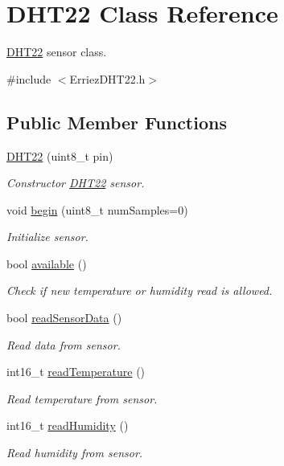 \hypertarget{class_d_h_t22}{}\section{D\+H\+T22 Class Reference}
\label{class_d_h_t22}


\hyperlink{class_d_h_t22}{D\+H\+T22} sensor class.  




{\ttfamily \#include $<$Erriez\+D\+H\+T22.\+h$>$}

\subsection*{Public Member Functions}
\begin{DoxyCompactItemize}
\item 
\hyperlink{class_d_h_t22_a6983635331e939d679888b4a936e0f53}{D\+H\+T22} (uint8\+\_\+t pin)
\begin{DoxyCompactList}\small\item\em Constructor \hyperlink{class_d_h_t22}{D\+H\+T22} sensor. \end{DoxyCompactList}\item 
void \hyperlink{class_d_h_t22_a6ecc18f5b1354e013d717a662f2e9e3d}{begin} (uint8\+\_\+t num\+Samples=0)
\begin{DoxyCompactList}\small\item\em Initialize sensor. \end{DoxyCompactList}\item 
bool \hyperlink{class_d_h_t22_a70b4c57d73f985e715bd523f15ccae25}{available} ()
\begin{DoxyCompactList}\small\item\em Check if new temperature or humidity read is allowed. \end{DoxyCompactList}\item 
bool \hyperlink{class_d_h_t22_ab01022d5617b70268fed481f64e560b9}{read\+Sensor\+Data} ()
\begin{DoxyCompactList}\small\item\em Read data from sensor. \end{DoxyCompactList}\item 
int16\+\_\+t \hyperlink{class_d_h_t22_aeed4f98e419ffb07d3e4c09ebc10162c}{read\+Temperature} ()
\begin{DoxyCompactList}\small\item\em Read temperature from sensor. \end{DoxyCompactList}\item 
int16\+\_\+t \hyperlink{class_d_h_t22_a4ff2d9fac4b8ecf1d72f71bb861c8dcf}{read\+Humidity} ()
\begin{DoxyCompactList}\small\item\em Read humidity from sensor. \end{DoxyCompactList}\end{DoxyCompactItemize}



